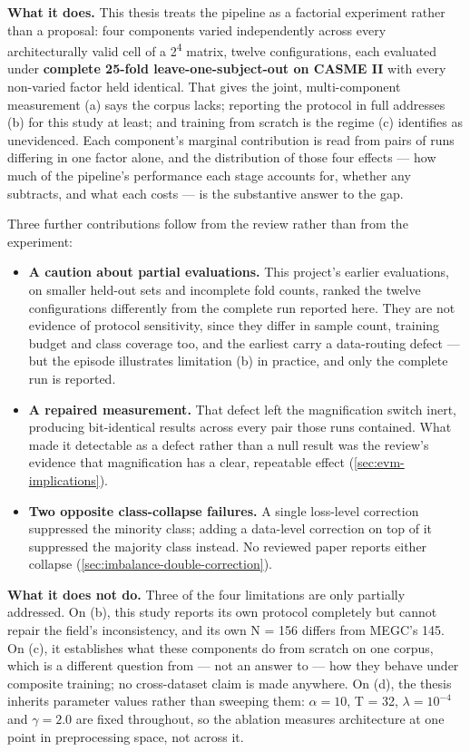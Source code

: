 \textbf{What it does.} This thesis treats the pipeline as a factorial experiment rather than a proposal: four components varied independently across every architecturally valid cell of a 2\textsuperscript{4} matrix, twelve configurations, each evaluated under \textbf{complete 25-fold leave-one-subject-out on CASME II} with every non-varied factor held identical. That gives the joint, multi-component measurement (a) says the corpus lacks; reporting the protocol in full addresses (b) for this study at least; and training from scratch is the regime (c) identifies as unevidenced. Each component's marginal contribution is read from pairs of runs differing in one factor alone, and the distribution of those four effects --- how much of the pipeline's performance each stage accounts for, whether any subtracts, and what each costs --- is the substantive answer to the gap.

Three further contributions follow from the review rather than from the experiment:

\begin{itemize}
	\item \textbf{A caution about partial evaluations.} This project's earlier evaluations, on smaller held-out sets and incomplete fold counts, ranked the twelve configurations differently from the complete run reported here. They are not evidence of protocol sensitivity, since they differ in sample count, training budget and class coverage too, and the earliest carry a data-routing defect --- but the episode illustrates limitation (b) in practice, and only the complete run is reported.
	\item \textbf{A repaired measurement.} That defect left the magnification switch inert, producing bit-identical results across every pair those runs contained. What made it detectable as a defect rather than a null result was the review's evidence that magnification has a clear, repeatable effect (\autoref{sec:evm-implications}).
	\item \textbf{Two opposite class-collapse failures.} A single loss-level correction suppressed the minority class; adding a data-level correction on top of it suppressed the majority class instead. No reviewed paper reports either collapse (\autoref{sec:imbalance-double-correction}).
\end{itemize}

\textbf{What it does not do.} Three of the four limitations are only partially addressed. On (b), this study reports its own protocol completely but cannot repair the field's inconsistency, and its own N = 156 differs from MEGC's 145. On (c), it establishes what these components do from scratch on one corpus, which is a different question from --- not an answer to --- how they behave under composite training; no cross-dataset claim is made anywhere. On (d), the thesis inherits parameter values rather than sweeping them: $\alpha = 10$, T = 32, $\lambda = 10^{-4}$ and $\gamma = 2.0$ are fixed throughout, so the ablation measures architecture at one point in preprocessing space, not across it.

